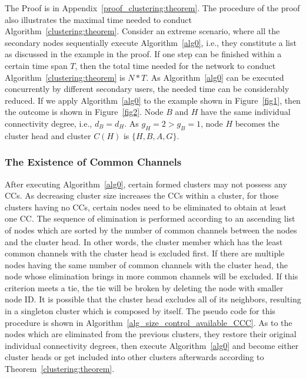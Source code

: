 \documentclass[times]{ettauth}
\newcommand{\ie}{i.e., }
\theoremstyle{mytheoremstyle}
\theoremstyle{mytheoremstyle}
\theoremstyle{mytheoremstyle}
\begin{document}
The Proof is in Appendix~\ref{proof_clustering:theorem}.
%
The procedure of the proof also illustrates the maximal time needed to conduct Algorithm~\ref{clustering:theorem}. 
Consider an extreme scenario, where all the secondary nodes sequentially execute Algorithm~\ref{alg0}, \ie they constitute a list as discussed in the example in the proof.
%
If one step can be finished within a certain time span $T$, then the total time needed for the network to conduct Algorithm~\ref{clustering:theorem} is $N*T$.
As Algorithm~\ref{alg0} can be executed concurrently by different secondary users, the needed time can be considerably reduced.
%
If we apply Algorithm~\ref{alg0} to the example shown in Figure~\ref{fig1}, then the outcome is shown in Figure~\ref{fig2}.
Node $B$ and $H$ have the same individual connectivity degree, i.e., $d_B=d_H$. As $g_H=2>g_B=1$, node $H$ becomes the cluster head and cluster $C(H)$ is $\{H, B, A, G\}$.
	




\subsubsection{The Existence of Common Channels}
\label{ross_p1_guarantee_ccc}
After executing Algorithm~\ref{alg0}, certain formed clusters may not possess any CCs.
As decreasing cluster size increases the CCs within a cluster, for those clusters having no CCs, certain nodes need to be eliminated to obtain at least one CC.
The sequence of elimination is performed according to an ascending list of nodes which are sorted by the number of common channels between the nodes and the cluster head. 
In other words, the cluster member which has the least common channels with the cluster head is excluded first.
If there are multiple nodes having the same number of common channels with the cluster head, the node whose elimination brings in more common channels will be excluded.
If this criterion meets a tie, the tie will be broken by deleting the node with smaller node ID.
It is possible that the cluster head excludes all of its neighbors, resulting in a singleton cluster which is composed by itself.
The pseudo code for this procedure is shown in Algorithm~\ref{alg_size_control_available_CCC}.
As to the nodes which are eliminated from the previous clusters, they restore their original individual connectivity degrees, then execute Algorithm~\ref{alg0} and become either cluster heads or get included into other clusters afterwards according to Theorem~\ref{clustering:theorem}.
\end{document}
